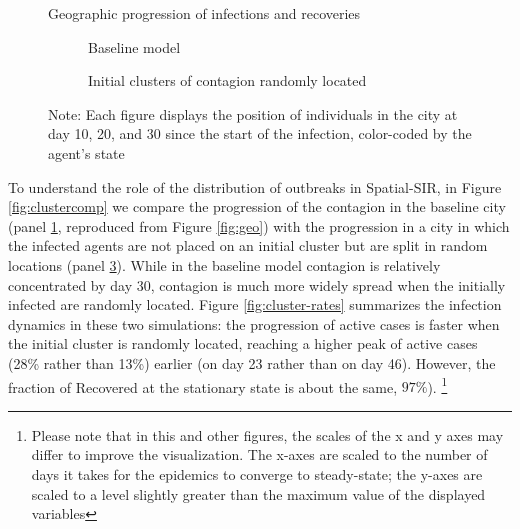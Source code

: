 \documentclass[english,11pt]{article}
\begin{document}
\begin{figure}[!ht]
    
    \caption{Geographic progression of infections and recoveries}\label{fig:clustercomp}
    
\begin{subfigure}{1.\linewidth}
    \caption{Baseline model} 
    \label{fig:geo2}
\end{subfigure} 

\begin{subfigure}{1.\linewidth}
    \caption{Initial clusters of contagion randomly located}
    \label{fig:City-cluster-comparisons}
\end{subfigure} 

   \caption*{\normalfont\footnotesize Note: Each figure displays the position of individuals in the city at day 10, 20, and 30 since the start of the infection, color-coded by the agent's state}
\end{figure}

To understand the role of the distribution of outbreaks in Spatial-SIR, in Figure \ref{fig:clustercomp}
we compare the progression of the contagion in the baseline city (panel \ref{fig:geo2}, reproduced from Figure \ref{fig:geo}) with the progression in a city in which the infected agents are not placed on an initial cluster but are split in random locations (panel \ref{fig:City-cluster-comparisons}). 
While in the baseline model
contagion is relatively concentrated by day 30, contagion is much more widely spread when the initially infected are randomly located. Figure \ref{fig:cluster-rates} summarizes the infection dynamics in these two simulations: the progression of active cases 
is faster when the initial cluster is randomly located, reaching a higher peak of
 active cases (28\% rather than 13\%) earlier (on day 23 rather than on day 46). However, the fraction of Recovered at the stationary state is about the same, $97\%$).%
\footnote{Please note that in this and other figures, the scales of the x and y axes may differ to improve the visualization. The x-axes are scaled to the number of days it takes for the epidemics to converge to steady-state; the y-axes are scaled to a level slightly greater than the maximum value of the displayed variables}
\end{document}
